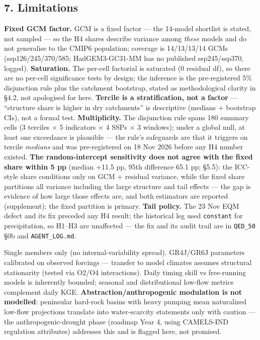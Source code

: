 \documentclass[
  english,
  11pt,
]{article}
\begin{document}
\subsection{7. Limitations}\label{limitations}

\textbf{Fixed GCM factor.} GCM is a fixed factor --- the 14-model
shortlist is stated, not sampled --- so the H4 shares describe variance
among \emph{these} models and do not generalise to the CMIP6 population;
coverage is 14/13/13/14 GCMs (ssp126/245/370/585; HadGEM3-GC31-MM has no
published ssp245/ssp370, logged). \textbf{Saturation.} The per-cell
factorial is saturated (0 residual df), so there are no per-cell
significance tests by design; the inference is the pre-registered 5\%
disjunction rule plus the catchment bootstrap, stated as methodological
clarity in §4.2, not apologised for here. \textbf{Tercile is a
stratification, not a factor} --- ``structure share is higher in dry
catchments'' is descriptive (medians + bootstrap CIs), not a formal
test. \textbf{Multiplicity.} The disjunction rule spans 180 summary
cells (3 terciles × 5 indicators × 4 SSPs × 3 windows); under a global
null, at least one exceedance is plausible --- the rule's safeguards are
that it triggers on tercile \emph{medians} and was pre-registered on 18
Nov 2026 before any H4 number existed. \textbf{The random-intercept
sensitivity does not agree with the fixed share within 5 pp} (median
+11.5 pp, 95th \textbar difference\textbar{} 65.1 pp; §5.5): the
ICC-style share conditions only on GCM + residual variance, while the
fixed share partitions all variance including the large structure and
tail effects --- the gap is evidence of how large those effects are, and
both estimators are reported (supplement); the fixed partition is
primary. \textbf{Tail policy.} The 23 Nov EQM defect and its fix
preceded any H4 result; the historical leg used \texttt{constant} for
precipitation, so H1--H3 are unaffected --- the fix and its audit trail
are in \texttt{QED\_50} §0b and \texttt{AGENT\_LOG.md}.

Single members only (no internal-variability spread). GR4J/GR6J
parameters calibrated on observed forcings --- transfer to model
climates assumes structural stationarity (tested via O2/O4
interactions). Daily timing skill vs free-running models is inherently
bounded; seasonal and distributional low-flow metrics complement daily
KGE. \textbf{Abstraction/anthropogenic modulation is not modelled}:
peninsular hard-rock basins with heavy pumping mean naturalized low-flow
projections translate into water-scarcity statements only with caution
--- the anthropogenic-drought phase (roadmap Year 4, using CAMELS-IND
regulation attributes) addresses this and is flagged here, not promised.
\end{document}

